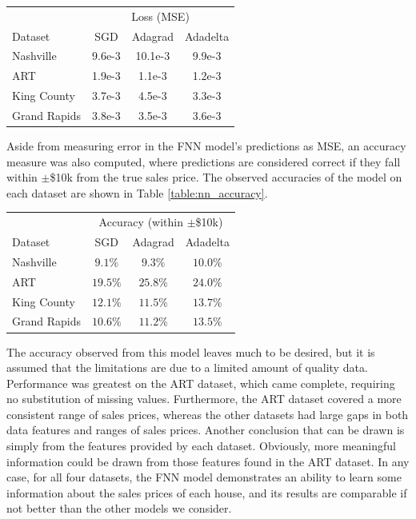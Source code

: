 \documentclass[10pt]{article}
\begin{document}
\begin{multicols}{2}
		\begin{center}
			\captionsetup{type=table}
			\begin{tabular}{l|c|c|c}
				& \multicolumn{3}{c}{Loss (MSE)} \\
				Dataset 		& SGD		& Adagrad	& Adadelta \\
				\hline
				Nashville 		& 9.6e-3 	& 10.1e-3 	& 9.9e-3 \\
				ART 			& 1.9e-3 	& 1.1e-3 	& 1.2e-3 \\
				King County 	& 3.7e-3 	& 4.5e-3 	& 3.3e-3 \\
				Grand Rapids 	& 3.8e-3 	& 3.5e-3 	& 3.6e-3 \\
			\end{tabular}
			\label{table:nn_performance}
		\end{center}
	
		Aside from measuring error in the FNN model's predictions as MSE, an accuracy measure was also computed, where predictions are considered correct if they fall within \(\pm\)\$10k from the true sales price. The observed accuracies of the model on each dataset are shown in Table \ref{table:nn_accuracy}.
		
		\begin{center}
		\captionsetup{type=table}
		\begin{tabular}{l|c|c|c}
			& \multicolumn{3}{c}{Accuracy (within \(\pm\)\$10k)} \\
			Dataset 		& SGD			& Adagrad		& Adadelta \\
			\hline
			Nashville		& \(9.1\%\)		& \(9.3\%\)		& \(10.0\%\) \\
			ART 			& \(19.5\%\) 	& \(25.8\%\)	& \(24.0\%\) \\
			King County 	& \(12.1\%\) 	& \(11.5\%\)	& \(13.7\%\) \\
			Grand Rapids 	& \(10.6\%\) 	& \(11.2\%\)	& \(13.5\%\) \\
		\end{tabular}
		\label{table:nn_accuracy}
		\end{center}
		
		The accuracy observed from this model leaves much to be desired, but it is assumed that the limitations are due to a limited amount of quality data. Performance was greatest on the ART dataset, which came complete, requiring no substitution of missing values. Furthermore, the ART dataset covered a more consistent range of sales prices, whereas the other datasets had large gaps in both data features and ranges of sales prices. Another conclusion that can be drawn is simply from the features provided by each dataset. Obviously, more meaningful information could be drawn from those features found in the ART dataset. In any case, for all four datasets, the FNN model demonstrates an ability to learn some information about the sales prices of each house, and its results are comparable if not better than the other models we consider.
		

\end{multicols}
\end{document}
